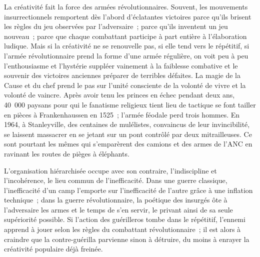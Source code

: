 \documentclass[french,twoside]{book} %
\newcommand{\astermono}{\medskip\centerline{\color{rubric}\large\selectfont{\syms ✻}}\medskip\par}%
\begin{document}
La créativité fait la force des armées révolutionnaires. Souvent, les mouvements insurrectionnels remportent dès l’abord d’éclatantes victoires parce qu’ils brisent les règles du jeu observées par l’adversaire ; parce qu’ils inventent un jeu nouveau ; parce que chaque combattant participe à part entière à l’élaboration ludique. Mais si la créativité ne se renouvelle pas, si elle tend vers le répétitif, si l’armée révolutionnaire prend la forme d’une armée régulière, on voit peu à peu l’enthousiasme et l’hystérie suppléer vainement à la faiblesse combative et le souvenir des victoires anciennes préparer de terribles défaites. La magie de la Cause et du chef prend le pas sur l’unité consciente de la volonté de vivre et la volonté de vaincre. Après avoir tenu les princes en échec pendant deux ans, 40 000 paysans pour qui le fanatisme religieux tient lieu de tactique se font tailler en pièces à Frankenhaussen en 1525 ; l’armée féodale perd trois hommes. En 1964, à Stanleyville, des centaines de mulélistes, convaincus de leur invincibilité, se laissent massacrer en se jetant sur un pont contrôlé par deux mitrailleuses. Ce sont pourtant les mêmes qui s’emparèrent des camions et des armes de l’ANC en ravinant les routes de pièges à éléphants.\par
L’organisation hiérarchisée occupe avec son contraire, l’indiscipline et l’incohérence, le lieu commun de l’inefficacité. Dans une guerre classique, l’inefficacité d’un camp l’emporte sur l’inefficacité de l’autre grâce à une inflation technique ; dans la guerre révolutionnaire, la poétique des insurgés ôte à l’adversaire les armes et le temps de s’en servir, le privant ainsi de sa seule supériorité possible. Si l’action des guérilleros tombe dans le répétitif, l’ennemi apprend à jouer selon les règles du combattant révolutionnaire ; il est alors à craindre que la contre-guérilla parvienne sinon à détruire, du moins à enrayer la créativité populaire déjà freinée.\par

\astermono
\end{document}
